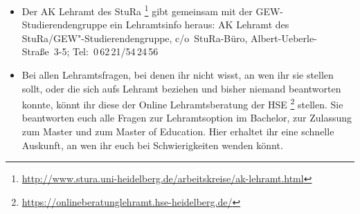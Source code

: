 \begin{itemize}
\item Der AK Lehramt des StuRa \footnote{\url{http://www.stura.uni-heidelberg.de/arbeitskreise/ak-lehramt.html}} gibt gemeinsam mit der  GEW-Stu\-dier\-en\-den\-grup\-pe ein Lehramtsinfo heraus: \newline AK Lehramt des StuRa/GEW"-Studierendengruppe, c/o~StuRa-Büro, Albert-Ueberle-Straße~3-5; Tel:~0\,62\,21/54\,24\,56

\item Bei allen Lehramtsfragen, bei denen ihr nicht wisst, an wen ihr sie stellen sollt, oder die sich aufs Lehramt beziehen und bisher niemand beantworten konnte, könnt ihr diese der Online Lehramtsberatung der HSE \footnote{\url{https://onlineberatunglehramt.hse-heidelberg.de/}} stellen. Sie beantworten euch alle Fragen zur Lehramtsoption im Bachelor, zur Zulassung zum Master und zum Master of Education. Hier erhaltet ihr eine schnelle Auskunft, an wen ihr euch bei Schwierigkeiten wenden könnt.


\end{itemize}


